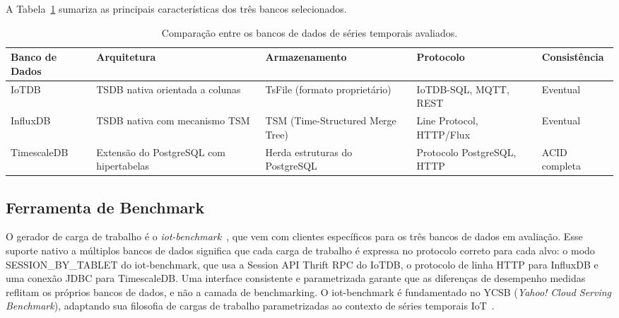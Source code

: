 A Tabela~\ref{tab:db_comparison} sumariza as principais características dos três bancos
selecionados.

\begin{table}[t]
  \centering
  \footnotesize
  \caption{Comparação entre os bancos de dados de séries temporais avaliados.}
  \label{tab:db_comparison}
  \begin{tabular}{lllll}
    \hline
    \textbf{Banco de Dados} & \textbf{Arquitetura} & \textbf{Armazenamento} & \textbf{Protocolo} & \textbf{Consistência} \\
    \hline
    IoTDB      & TSDB nativa orientada a colunas                    & TsFile (formato proprietário)          & IoTDB-SQL, MQTT, REST         & Eventual      \\
    InfluxDB   & TSDB nativa com mecanismo TSM                      & TSM (Time-Structured Merge Tree)       & Line Protocol, HTTP/Flux      & Eventual      \\
    TimescaleDB & Extensão do PostgreSQL com hipertabelas            & Herda estruturas do PostgreSQL         & Protocolo PostgreSQL, HTTP    & ACID completa \\
    \hline
  \end{tabular}
\end{table}

\subsection{Ferramenta de Benchmark}
\label{sec:benchmark-tool}

O gerador de carga de trabalho é o \textit{iot-benchmark}~\citep{iotbenchmark}, que vem com clientes específicos para os três bancos de dados em
avaliação. Esse suporte nativo a múltiplos bancos de dados significa que cada carga de trabalho
é expressa no protocolo correto para cada alvo: o modo SESSION\_BY\_TABLET do iot-benchmark, que usa a Session API Thrift RPC do IoTDB,
o protocolo de linha HTTP para InfluxDB e uma conexão JDBC para TimescaleDB. Uma
interface consistente e parametrizada garante que as diferenças de desempenho medidas reflitam
os próprios bancos de dados, e não a camada de benchmarking. O iot-benchmark é fundamentado no
YCSB (\textit{Yahoo! Cloud Serving Benchmark}), adaptando sua filosofia de cargas de trabalho
parametrizadas ao contexto de séries temporais IoT~\citep{iotbenchmarkdoc}.

